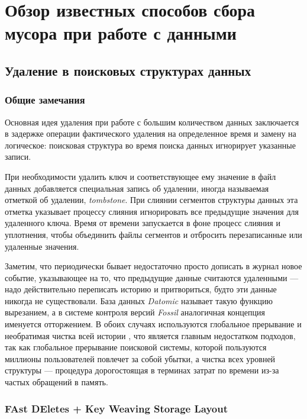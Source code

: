 \newpage
\section{Обзор известных способов сбора мусора при работе с данными}

\subsection{Удаление в поисковых структурах данных}

\subsubsection{Общие замечания}

Основная идея удаления при работе с большим количеством данных заключается в задержке
операции фактического удаления на определенное время и замену на логическое:
поисковая структура во время поиска данных игнорирует указанные записи. 

При необходимости удалить ключ и соответствующее ему значение в файл данных добавляется
специальная запись об удалении, иногда называемая отметкой об удалении,
\textit{tombstone}. При слиянии сегментов структуры данных эта отметка
указывает процессу слияния игнорировать все предыдущие значения для удаленного ключа.
Время от времени запускается в фоне процесс слияния и уплотнения, чтобы объединить файлы
сегментов и отбросить перезаписанные или удаленные значения.

Заметим, что периодически бывает недостаточно просто дописать в журнал новое событие,
указывающее на то, что предыдущие данные считаются удаленными — надо действительно
переписать историю и притвориться, будто эти данные никогда не существовали. 
База данных \textit{Datomic} \cite{Datomic:2021} называет такую функцию вырезанием,
а в системе контроля версий \textit{Fossil} \cite{Fossil:2007} аналогичная концепция
именуется отторжением. В обоих случаях используются глобальное прерывание
и необратимая чистка всей истории \cite{Kleppman:2017}, что является главным недостатком
подходов, так как глобальное прерывание поисковой системы, которой пользуются миллионы
пользователей повлечет за собой убытки, а чистка всех уровней структуры — процедура
дорогостоящая в терминах затрат по времени из-за частых обращений в память.  

\subsubsection{FAst DEletes + Key Weaving Storage Layout}

